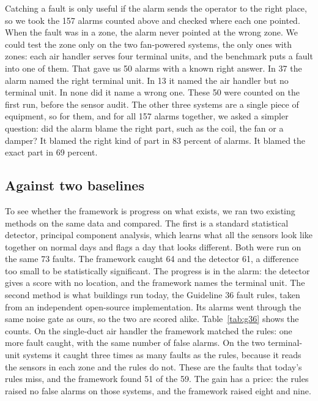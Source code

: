\documentclass[conference]{IEEEtran}
\begin{document}
Catching a fault is only useful if the alarm sends the operator to the right place, so we took the 157 alarms counted above and checked where each one pointed. When the fault was in a zone, the alarm never pointed at the wrong zone. We could test the zone only on the two fan-powered systems, the only ones with zones: each air handler serves four terminal units, and the benchmark puts a fault into one of them. That gave us 50 alarms with a known right answer. In 37 the alarm named the right terminal unit. In 13 it named the air handler but no terminal unit. In none did it name a wrong one. These 50 were counted on the first run, before the sensor audit. The other three systems are a single piece of equipment, so for them, and for all 157 alarms together, we asked a simpler question: did the alarm blame the right part, such as the coil, the fan or a damper? It blamed the right kind of part in 83 percent of alarms. It blamed the exact part in 69 percent.

\subsection{Against two baselines}

To see whether the framework is progress on what exists, we ran two existing methods on the same data and compared. The first is a standard statistical detector, principal component analysis, which learns what all the sensors look like together on normal days and flags a day that looks different. Both were run on the same 73 faults. The framework caught 64 and the detector 61, a difference too small to be statistically significant. The progress is in the alarm: the detector gives a score with no location, and the framework names the terminal unit. The second method is what buildings run today, the Guideline 36 fault rules, taken from an independent open-source implementation. Its alarms went through the same noise gate as ours, so the two are scored alike. Table~\ref{tab:g36} shows the counts. On the single-duct air handler the framework matched the rules: one more fault caught, with the same number of false alarms. On the two terminal-unit systems it caught three times as many faults as the rules, because it reads the sensors in each zone and the rules do not. These are the faults that today's rules miss, and the framework found 51 of the 59. The gain has a price: the rules raised no false alarms on those systems, and the framework raised eight and nine.
\end{document}
